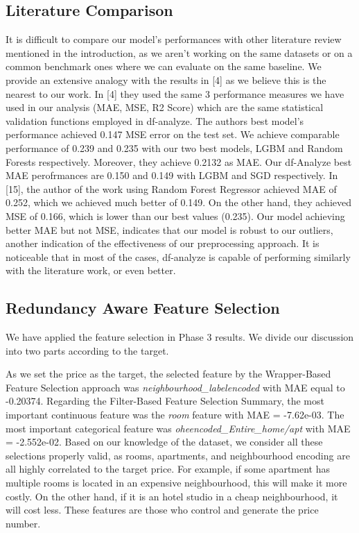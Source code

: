 \documentclass[a4paper,12pt]{article}
\begin{document}
\subsection*{Literature Comparison}

It is difficult to compare our model's performances with other literature review mentioned in the introduction, as we aren't working on the same datasets or on a common benchmark ones where we can evaluate on the same baseline. We provide an extensive analogy with the results in [4] as we believe this is the nearest to our work. In [4] they used the same 3 performance measures we have used in our analysis (MAE, MSE, R2 Score) which are the same statistical validation functions employed in df-analyze. The authors best model's performance achieved 0.147 MSE error on the test set. We achieve comparable performance of 0.239 and 0.235 with our two best models, LGBM and Random Forests respectively. Moreover, they achieve 0.2132 as MAE. Our df-Analyze best MAE perofrmances are 0.150 and 0.149 with LGBM and SGD respectively. In [15], the author of the work using Random Forest Regressor achieved MAE of 0.252, which we achieved much better of 0.149. On the other hand, they achieved MSE of 0.166, which is lower than our best values (0.235). Our model achieving better MAE but not MSE, indicates that our model is robust to our outliers, another indication of the effectiveness of our preprocessing approach. It is noticeable that in most of the cases, df-analyze is capable of performing similarly with the literature work, or even better.

\subsection*{Redundancy Aware Feature Selection}

We have applied the feature selection in Phase 3 results. We divide our discussion into two parts according to the target.

As we set the price as the target, the selected feature by the Wrapper-Based Feature Selection approach was \textit{neighbourhood\_labelencoded} with MAE equal to -0.20374. Regarding the Filter-Based Feature Selection Summary, the most important continuous feature was the \textit{room} feature with MAE = -7.62e-03. \newline
The most important categorical feature was \textit{oheencoded\_Entire\_home/apt} with MAE = -2.552e-02. Based on our knowledge of the dataset, we consider all these selections properly valid, as rooms, apartments, and neighbourhood encoding are all highly correlated to the target price. For example, if some apartment has multiple rooms is located in an expensive neighbourhood, this will make it more costly. On the other hand, if it is an hotel studio in a cheap neighbourhood, it will cost less. These features are those who control and generate the price number.
\end{document}
